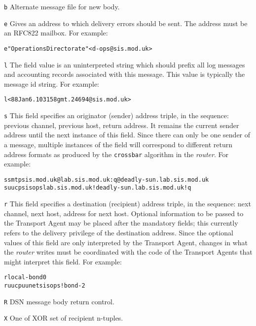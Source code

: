 {\tt b}     
Alternate message file for new body.

{\tt e}     
Gives an address to which delivery errors should be sent.  The address
must be an RFC822 mailbox.  For example:

\begin{alltt}
          e "Operations Directorate" <d-ops@sis.mod.uk>
\end{alltt}


{\tt l}     
The field value is an uninterpreted string which should prefix all log
messages and accounting records associated with this message.  This
value is typically the message id string.  For example:

\begin{alltt}
          l <88Jan6.103158gmt.24694@sis.mod.uk>
\end{alltt}


{\tt s}     
This field specifies an originator (sender) address triple, in the
sequence: previous channel, previous host, return address.  It remains
the current sender address until the next instance of this field.
Since there can only be one sender of a message, multiple instances of
the field will correspond to different return address formats as
produced by the {\tt crossbar} algorithm in the {\em router}.
For example:

\begin{alltt}
          s smtp sis.mod.uk @lab.sis.mod.uk:q@deadly-sun.lab.sis.mod.uk
          s uucp sisops lab.sis.mod.uk!deadly-sun.lab.sis.mod.uk!q
\end{alltt}


{\tt r}     
This field specifies a destination (recipient) address triple, in the
sequence: next channel, next host, address for next host.  Optional
information to be passed to the Transport Agent may be placed after the
mandatory fields; this currently refers to the delivery privilege of the
destination address.  Since the optional values of this field are only
interpreted by the Transport Agent, changes in what the {\em router} writes
must be coordinated with the code of the Transport Agents that might
interpret this field.  For example:

\begin{alltt}
          r local - bond 0
          r uucp uunet sisops!bond -2
\end{alltt}


{\tt R}
DSN message body return control.

{\tt X}
One of XOR set of recipient n-tuples.

